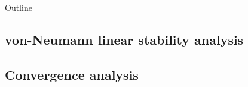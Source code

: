 \begin{frame}[plain]{Outline}
\end{frame}


\subsection{von-Neumann linear stability analysis}
\subsection{Convergence analysis}

